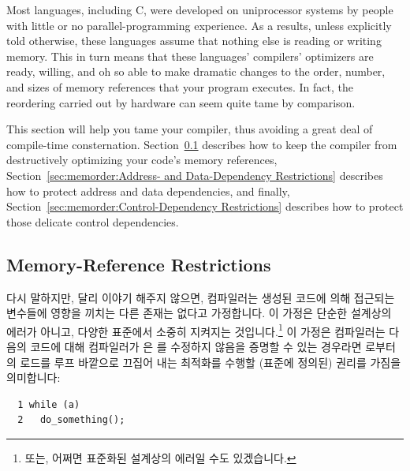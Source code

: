 Most languages, including C, were developed on uniprocessor systems
by people with little or no parallel-programming experience.
As a results, unless explicitly told otherwise, these languages assume
that nothing else is reading or writing memory.
This in turn means that these languages' compilers' optimizers
are ready, willing, and oh so able to make dramatic changes to the
order, number, and sizes of memory references that your program
executes.
In fact, the reordering carried out by hardware can seem quite tame
by comparison.

This section will help you tame your compiler, thus avoiding a great
deal of compile-time consternation.
Section~\ref{sec:memorder:Memory-Reference Restrictions}
describes how to keep the compiler from destructively optimizing
your code's memory references,
Section~\ref{sec:memorder:Address- and Data-Dependency Restrictions}
describes how to protect address and data dependencies,
and finally,
Section~\ref{sec:memorder:Control-Dependency Restrictions}
describes how to protect those delicate control dependencies.
\fi

\subsection{Memory-Reference Restrictions}
\label{sec:memorder:Memory-Reference Restrictions}

다시 말하지만, 달리 이야기 해주지 않으면, 컴파일러는 생성된 코드에 의해
접근되는 변수들에 영향을 끼치는 다른 존재는 없다고 가정합니다.
이 가정은 단순한 설계상의 에러가 아니고, 다양한 표준에서 소중히 지켜지는
것입니다.\footnote{
	또는, 어쩌면 표준화된 설계상의 에러일 수도 있겠습니다.}
이 가정은 컴파일러는 다음의 코드에 대해 컴파일러가  은
 를 수정하지 않음을 증명할 수 있는 경우라면  로부터의 로드를 루프
바깥으로 끄집어 내는 최적화를 수행할 (표준에 정의된) 권리를 가짐을 의미합니다:

\vspace{5pt}
\begin{minipage}[t]{\columnwidth}
\scriptsize
\begin{verbatim}
  1 while (a)
  2   do_something();
\end{verbatim}
\end{minipage}
\vspace{5pt}

